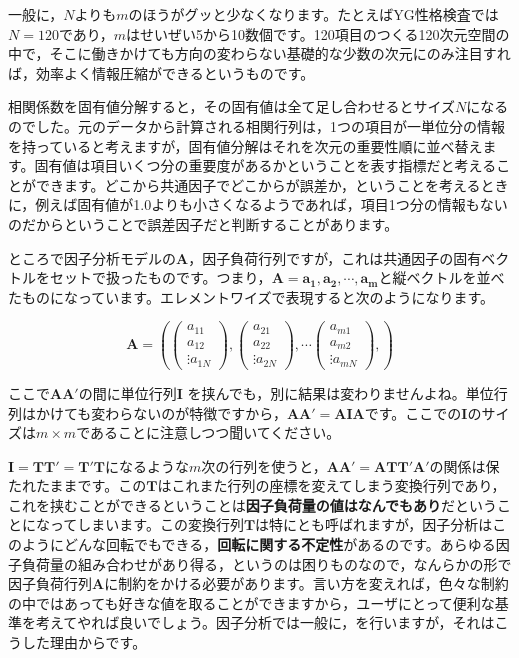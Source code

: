 \documentclass{ltjsbook}
\begin{document}
一般に，$N$よりも$m$のほうがグッと少なくなります。たとえばYG性格検査では$N=120$であり，$m$はせいぜい5から10数個です。120項目のつくる120次元空間の中で，そこに働きかけても方向の変わらない基礎的な少数の次元にのみ注目すれば，効率よく情報圧縮ができるというものです。

相関係数を固有値分解すると，その固有値は全て足し合わせるとサイズ$N$になるのでした。元のデータから計算される相関行列は，1つの項目が一単位分の情報を持っていると考えますが，固有値分解はそれを次元の重要性順に並べ替えます。固有値は項目いくつ分の重要度があるかということを表す指標だと考えることができます。どこから共通因子でどこからが誤差か，ということを考えるときに，例えば固有値が1.0よりも小さくなるようであれば，項目1つ分の情報もないのだからということで誤差因子だと判断することがあります。

ところで因子分析モデルの$\bm{A}$，因子負荷行列ですが，これは共通因子の固有ベクトルをセットで扱ったものです。つまり，$\bm{A} = \bm{a_1,a_2,\cdots,a_m}$と縦ベクトルを並べたものになっています。エレメントワイズで表現すると次のようになります。

\[
   \bm{A} = \left (
       \begin{pmatrix}  a_{11}\\a_{12}\\\vdots a_{1N} \end{pmatrix},
       \begin{pmatrix}  a_{21}\\a_{22}\\\vdots a_{2N} \end{pmatrix},
       \cdots
       \begin{pmatrix}  a_{m1}\\a_{m2}\\\vdots a_{mN} \end{pmatrix},
    \right )
\]

ここで$\bm{AA'}$の間に単位行列$\bm{I}$ を挟んでも，別に結果は変わりませんよね。単位行列はかけても変わらないのが特徴ですから，$\bm{AA'}=\bm{AIA}$です。ここでの$\bm{I}$のサイズは$m \times m$であることに注意しつつ聞いてください。

$\bm{I} = \bm{TT'}=\bm{T'T}$になるような$m$次の行列を使うと，$\bm{AA'} = \bm{ATT'A'}$の関係は保たれたままです。この$\bm{T}$はこれまた行列の座標を変えてしまう変換行列であり，これを挟むことができるということは\textbf{因子負荷量の値はなんでもあり}だということになってしまいます。この変換行列$\bm{T}$は特にとも呼ばれますが，因子分析はこのようにどんな回転でもできる，\textbf{回転に関する不定性}があるのです。あらゆる因子負荷量の組み合わせがあり得る，というのは困りものなので，なんらかの形で因子負荷行列$\bm{A}$に制約をかける必要があります。言い方を変えれば，色々な制約の中ではあっても好きな値を取ることができますから，ユーザにとって便利な基準を考えてやれば良いでしょう。因子分析では一般に，を行いますが，それはこうした理由からです。
\end{document}
